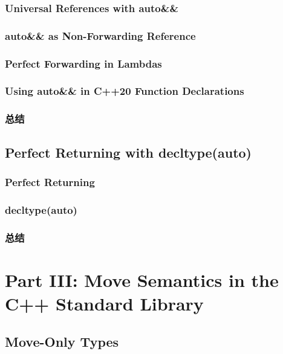 \documentclass[11pt,a4paper,UTF8]{ctexart}
\begin{document}
		\subsubsection{Universal References with auto\&\&}
		\subsubsection{auto\&\& as Non-Forwarding Reference}
		\subsubsection{Perfect Forwarding in Lambdas}
		\subsubsection{Using auto\&\& in C++20 Function Declarations}
		\subsubsection{总结}
	\subsection{Perfect Returning with decltype(auto)}
		\subsubsection{Perfect Returning}
		\subsubsection{decltype(auto)}
		\subsubsection{总结}
		
	\section{Part III: Move Semantics in the C++ Standard Library}
	\subsection{Move-Only Types}
\end{document}
